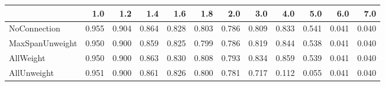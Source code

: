 \begin{tabular}{lrrrrrrrrrrr}
\toprule
{} &   1.0 &   1.2 &   1.4 &   1.6 &   1.8 &   2.0 &   3.0 &   4.0 &   5.0 &   6.0 &   7.0 \\
\midrule
NoConnection    & 0.955 & 0.904 & 0.864 & 0.828 & 0.803 & 0.786 & 0.809 & 0.833 & 0.541 & 0.041 & 0.040 \\
MaxSpanUnweight & 0.950 & 0.900 & 0.859 & 0.825 & 0.799 & 0.786 & 0.819 & 0.844 & 0.538 & 0.041 & 0.040 \\
AllWeight       & 0.950 & 0.900 & 0.863 & 0.830 & 0.808 & 0.793 & 0.834 & 0.859 & 0.539 & 0.041 & 0.040 \\
AllUnweight     & 0.951 & 0.900 & 0.861 & 0.826 & 0.800 & 0.781 & 0.717 & 0.112 & 0.055 & 0.041 & 0.040 \\
\bottomrule
\end{tabular}
